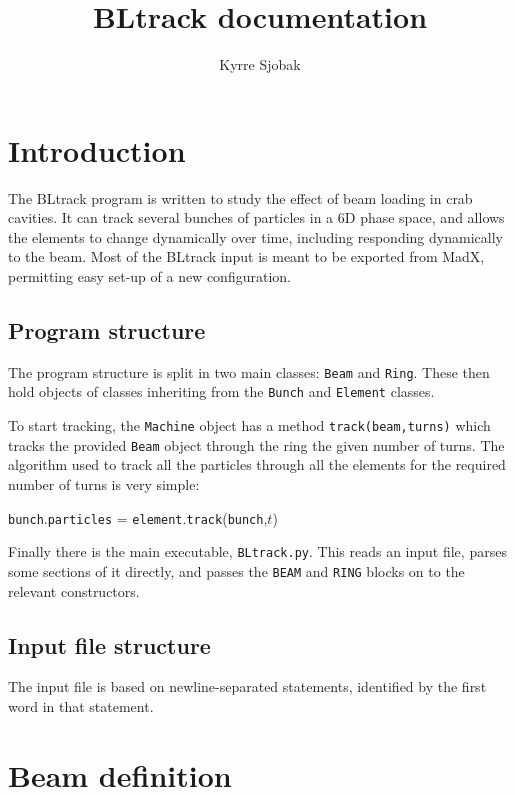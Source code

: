 \documentclass[a4paper]{report}
\title{BLtrack documentation}
\author{Kyrre Sjobak}
\begin{document}
\maketitle
\newpage
\tableofcontents

\chapter{Introduction}

The BLtrack program is written to study the effect of beam loading in crab cavities.
It can track several bunches of particles in a 6D phase space, and allows the elements to change dynamically over time, including responding dynamically to the beam.
Most of the BLtrack input is meant to be exported from MadX, permitting easy set-up of a new configuration.

\section{Program structure}
The program structure is split in two main classes: \texttt{Beam} and \texttt{Ring}.
These then hold objects of classes inheriting from the \texttt{Bunch} and \texttt{Element} classes.

To start tracking, the \texttt{Machine} object has a method \texttt{track(beam,turns)} which tracks the provided \texttt{Beam} object through the ring the given number of turns.
The algorithm used to track all the particles through all the elements for the required number of turns is very simple:
\begin{algorithmic}
        \STATE \texttt{bunch}.\texttt{particles} = \texttt{element}.\texttt{track}(\texttt{bunch},$t$)
      \ENDFOR
    \ENDFOR
  \ENDFOR
\end{algorithmic}

Finally there is the main executable, \texttt{BLtrack.py}.
This reads an input file, parses some sections of it directly, and passes the \texttt{BEAM} and \texttt{RING} blocks on to the relevant constructors.

\section{Input file structure}
The input file is based on newline-separated statements, identified by the first word in that statement.


\chapter{Beam definition}
\end{document}
